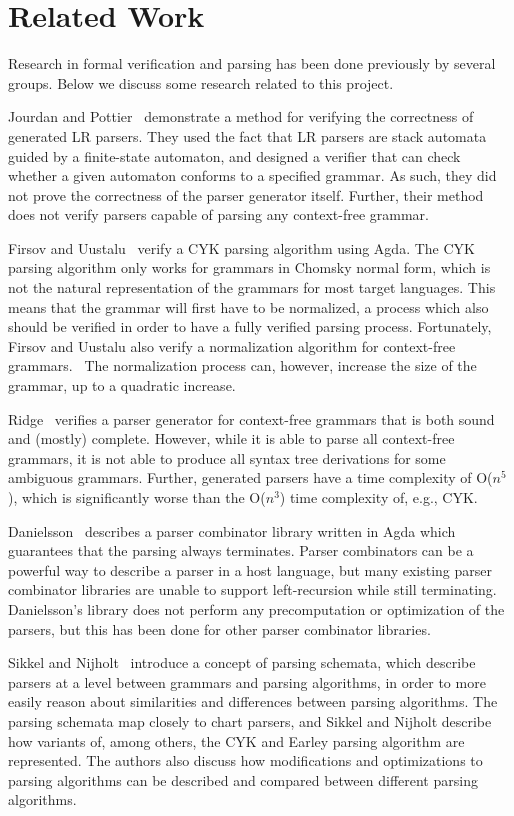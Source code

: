 
\chapter{Related Work} \label{Related}

	Research in formal verification and parsing has been done previously by
	several groups. Below we discuss some research related to this project.

	Jourdan and Pottier~\cite{Jourdan} demonstrate a method for verifying the
	correctness of generated LR parsers. They used the fact that LR parsers are
	stack automata guided by a finite-state automaton, and designed a verifier
	that can check whether a given automaton conforms to a specified grammar.
	As such, they did not prove the correctness of the parser generator itself.
	Further, their method does not verify parsers capable of parsing any
	context-free grammar.

	Firsov and Uustalu~\cite{Firsov14} verify a CYK parsing algorithm using
	Agda. The CYK parsing algorithm only works for grammars in Chomsky normal
	form, which is not the natural representation of the grammars for most
	target languages. This means that the grammar will first have to be
	normalized, a process which also should be verified in order to have a
	fully verified parsing process. Fortunately, Firsov and Uustalu also verify
	a normalization algorithm for context-free grammars.~\cite{Firsov15} The
	normalization process can, however, increase the size of the grammar, up to
	a quadratic increase.

	Ridge~\cite{ridge11} verifies a parser generator for context-free grammars
	that is both sound and (mostly) complete. However, while it is able to
	parse all context-free grammars, it is not able to produce all syntax tree
	derivations for some ambiguous grammars. Further, generated parsers have a
	time complexity of O($n^5$), which is significantly worse than the O($n^3$)
	time complexity of, e.g., CYK. 

	Danielsson~\cite{nad2009} describes a parser combinator library written in
	Agda which guarantees that the parsing always terminates. Parser
	combinators can be a powerful way to describe a parser in a host language,
	but many existing parser combinator libraries are unable to support
	left-recursion while still terminating. Danielsson's library does not
	perform any precomputation or optimization of the parsers, but this has
	been done for other parser combinator libraries.

	Sikkel and Nijholt~\cite{sikkel97} introduce a concept of parsing schemata,
	which describe parsers at a level between grammars and parsing algorithms,
	in order to more easily reason about similarities and differences between
	parsing algorithms. The parsing schemata map closely to chart parsers, and
	Sikkel and Nijholt describe how variants of, among others, the CYK and
	Earley parsing algorithm are represented. The authors also discuss how
	modifications and optimizations to parsing algorithms can be described and
	compared between different parsing algorithms.

